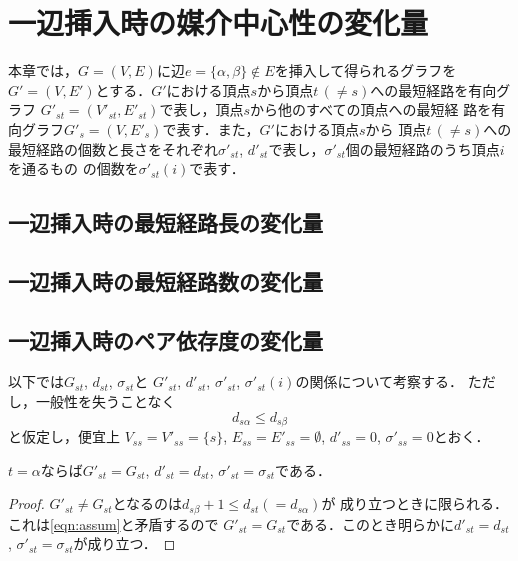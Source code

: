 \chapter{一辺挿入時の媒介中心性の変化量}
\label{chap:update-bc-on-insert}
本章では，$G=(V,E)$に辺$e=\{\alpha,\beta\} \not\in E$を挿入して得られるグラフを
$G'=(V,E')$とする．$G'$における頂点$s$から頂点$t\,(\neq s)$への最短経路を有向グラフ
$G'_{st}=(V'_{st},E'_{st})$で表し，頂点$s$から他のすべての頂点への最短経
路を有向グラフ$G'_s=(V,E'_s)$で表す．また，$G'$における頂点$s$から
頂点$t\,(\neq s)$への最短経路の個数と長さをそれぞれ$\sigma'_{st}$, 
$d'_{st}$で表し，$\sigma'_{st}$個の最短経路のうち頂点$i$を通るもの
の個数を$\sigma'_{st}(i)$で表す．

\section{一辺挿入時の最短経路長の変化量}
\label{sect:update-dist-on-insert}

\section{一辺挿入時の最短経路数の変化量}
\label{sect:update-sigma-on-insert}

\section{一辺挿入時のペア依存度の変化量}
\label{sect:update-deps-on-insert}

以下では$G_{st}$, $d_{st}$, $\sigma_{st}$と
$G'_{st}$, $d'_{st}$, $\sigma'_{st}$, $\sigma'_{st}(i)$の関係について考察する．
ただし，一般性を失うことなく
\begin{equation}
d_{s\alpha} \leq d_{s\beta}
\label{eqn:assum}
\end{equation}
と仮定し，便宜上
$V_{ss}=V'_{ss}=\{s\}$, $E_{ss}=E'_{ss}=\emptyset$, $d'_{ss}=0$, 
$\sigma'_{ss}=0$とおく．

\begin{lemma}
$t=\alpha$ならば$G'_{st}=G_{st}$, $d'_{st}=d_{st}$, 
$\sigma'_{st}=\sigma_{st}$である．
\label{lemma:5}
\end{lemma}
\begin{proof}
$G'_{st} \neq G_{st}$となるのは$d_{s\beta}+1 \leq d_{st}(=d_{s\alpha})$が
成り立つときに限られる．これは\eqref{eqn:assum}と矛盾するので
$G'_{st}=G_{st}$である．このとき明らかに$d'_{st}=d_{st}$, 
$\sigma'_{st}=\sigma_{st}$が成り立つ．
\end{proof}

